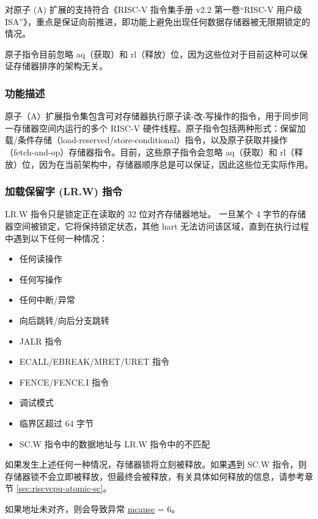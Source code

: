 \documentclass[main\_\_CN.tex]{subfiles}
\begin{document}
对原子 (A) 扩展的支持符合《RISC-V 指令集手册 v2.2 第一卷“RISC-V 用户级 ISA”》，重点是保证向前推进，即功能上避免出现任何数据存储器被无限期锁定的情况。

原子指令目前忽略 aq（获取）和 rl（释放）位，因为这些位对于目前这种可以保证存储器排序的架构无关。

\subsubsection{功能描述}
\label{sec:riscvcpu-atomic-func-descr}

原子（A）扩展指令集包含可对存储器执行原子读-改-写操作的指令，用于同步同一存储器空间内运行的多个 RISC-V 硬件线程。原子指令包括两种形式：保留加载/条件存储（load-reserved/store-conditional）指令，以及原子获取并操作（fetch-and-op）存储器指令。目前，这些原子指令会忽略 aq（获取）和 rl（释放）位，因为在当前架构中，存储器顺序总是可以保证，因此这些位无实际作用。

\subsubsection{加载保留字 (LR.W) 指令}
\label{sec:riscvcpu-atomic-lr}

LR.W 指令只是锁定正在读取的 32 位对齐存储器地址。 一旦某个 4 字节的存储器空间被锁定，它将保持锁定状态，其他 hart 无法访问该区域，直到在执行过程中遇到以下任何一种情况：

\begin{itemize}
    \item 任何读操作
    \item 任何写操作
    \item 任何中断/异常
    \item 向后跳转/向后分支跳转
    \item JALR 指令
    \item ECALL/EBREAK/MRET/URET 指令
    \item FENCE/FENCE.I 指令
    \item 调试模式
    \item 临界区超过 64 字节
    \item SC.W 指令中的数据地址与 LR.W 指令中的不匹配
\end{itemize}

如果发生上述任何一种情况，存储器锁将立刻被释放。如果遇到 SC.W 指令，则存储器锁不会立即被释放，但最终会被释放，有关具体如何释放的信息，请参考章节 \ref{sec:riscvcpu-atomic-sc}。

如果地址未对齐，则会导致异常 \hyperref[regdesc:MCAUSE]{mcause} = 6。
\end{document}
